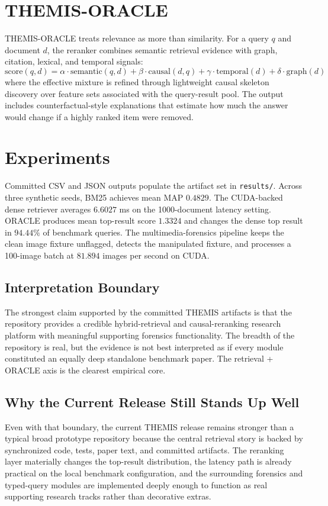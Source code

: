 \documentclass{article}
\begin{document}
\section{THEMIS-ORACLE}
THEMIS-ORACLE treats relevance as more than similarity. For a query $q$ and document $d$, the reranker combines semantic retrieval evidence with graph, citation, lexical, and temporal signals:
\[
\mathrm{score}(q, d) =
\alpha \cdot \mathrm{semantic}(q, d) +
\beta \cdot \mathrm{causal}(d, q) +
\gamma \cdot \mathrm{temporal}(d) +
\delta \cdot \mathrm{graph}(d)
\]
where the effective mixture is refined through lightweight causal skeleton discovery over feature sets associated with the query-result pool. The output includes counterfactual-style explanations that estimate how much the answer would change if a highly ranked item were removed.

\section{Experiments}
Committed CSV and JSON outputs populate the artifact set in \texttt{results/}. Across three synthetic seeds, BM25 achieves mean MAP $0.4829$. The CUDA-backed dense retriever averages $6.6027$ ms on the 1000-document latency setting. ORACLE produces mean top-result score $1.3324$ and changes the dense top result in $94.44\%$ of benchmark queries. The multimedia-forensics pipeline keeps the clean image fixture unflagged, detects the manipulated fixture, and processes a 100-image batch at $81.894$ images per second on CUDA.

\subsection{Interpretation Boundary}
The strongest claim supported by the committed THEMIS artifacts is that the
repository provides a credible hybrid-retrieval and causal-reranking research
platform with meaningful supporting forensics functionality. The breadth of the
repository is real, but the evidence is not best interpreted as if every module
constituted an equally deep standalone benchmark paper. The retrieval +
ORACLE axis is the clearest empirical core.

\subsection{Why the Current Release Still Stands Up Well}
Even with that boundary, the current THEMIS release remains stronger than a
typical broad prototype repository because the central retrieval story is backed
by synchronized code, tests, paper text, and committed artifacts. The reranking
layer materially changes the top-result distribution, the latency path is
already practical on the local benchmark configuration, and the surrounding
forensics and typed-query modules are implemented deeply enough to function as
real supporting research tracks rather than decorative extras.
\end{document}
